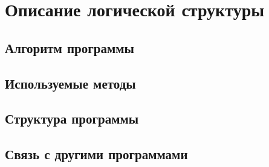 
\section{Описание логической структуры}

\subsection{Алгоритм программы}

%
%



\subsection{Используемые методы}

%
%



\subsection{Структура программы}

%
%



\subsection{Связь с другими программами}

%
%
